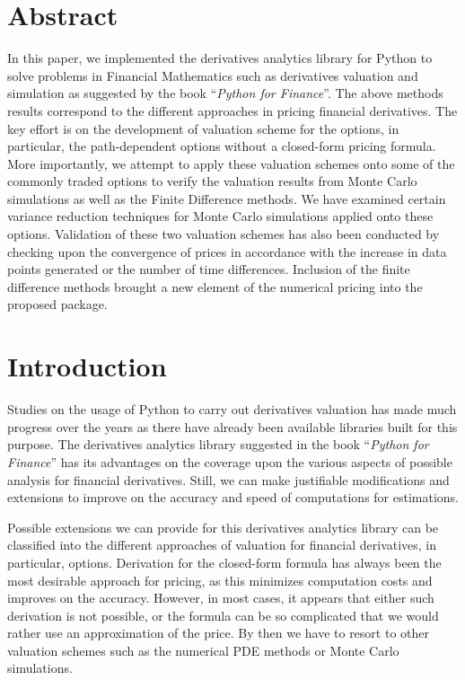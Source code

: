 \section*{Abstract}
In this paper, we implemented the derivatives analytics library for Python to solve problems in Financial Mathematics such as derivatives valuation and simulation as suggested by the book ``\emph{Python for Finance}''\cite{PythonForFinance}. The above methods results correspond to the different approaches in pricing financial derivatives. The key effort is on the development of valuation scheme for the options, in particular, the path-dependent options without a closed-form pricing formula. More importantly, we attempt to apply these valuation schemes onto some of the commonly traded options to verify the valuation results from Monte Carlo simulations as well as the Finite Difference methods. We have examined certain variance reduction techniques for Monte Carlo simulations applied onto these options. Validation of these two valuation schemes has also been conducted by checking upon the convergence of prices in accordance with the increase in data points generated or the number of time differences. Inclusion of the finite difference methods brought a new element of the numerical pricing into the proposed package.

\section*{Introduction}
Studies on the usage of Python to carry out derivatives valuation has made much progress over the years as there have already been available libraries built for this purpose. The derivatives analytics library suggested in the book ``\emph{Python for Finance}'' has its advantages on the coverage upon the various aspects of possible analysis for financial derivatives. Still, we can make justifiable modifications and extensions to improve on the accuracy and speed of computations for estimations.

Possible extensions we can provide for this derivatives analytics library can be classified into the different approaches of valuation for financial derivatives, in particular, options. Derivation for the closed-form formula has always been the most desirable approach for pricing, as this minimizes computation costs and improves on the accuracy. However, in most cases, it appears that either such derivation is not possible, or the formula can be so complicated that we would rather use an approximation of the price. By then we have to resort to other valuation schemes such as the numerical PDE methods or Monte Carlo simulations.

